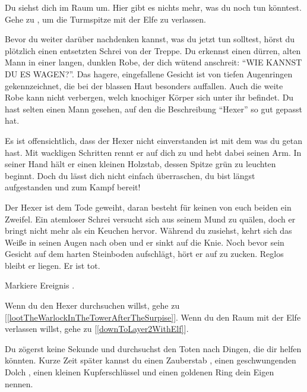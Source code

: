
Du siehst dich im Raum um. Hier gibt es nichts mehr, was du noch tun könntest.
Gehe zu , um die Turmspitze mit der Elfe zu verlassen.


Bevor du weiter darüber nachdenken kannst, was du jetzt tun solltest, hörst du plötzlich einen entsetzten Schrei von der Treppe. Du erkennst einen dürren, alten Mann in einer langen, dunklen Robe, der dich wütend anschreit: ``WIE KANNST DU ES WAGEN?''. Das hagere, eingefallene Gesicht ist von tiefen Augenringen gekennzeichnet, die bei der blassen Haut besonders auffallen. Auch die weite Robe kann nicht verbergen, welch knochiger Körper sich unter ihr befindet. Du hast selten einen Mann gesehen, auf den die Beschreibung ``Hexer'' so gut gepasst hat.

Es ist offensichtlich, dass der Hexer nicht einverstanden ist mit dem was du getan hast. Mit wackligen Schritten rennt er auf dich zu und hebt dabei seinen Arm. In seiner Hand hält er einen kleinen Holzstab, dessen Spitze grün zu leuchten beginnt. Doch du lässt dich nicht einfach überraschen, du bist längst aufgestanden und zum Kampf bereit!



Der Hexer ist dem Tode geweiht, daran besteht für keinen von euch beiden ein Zweifel. Ein atemloser Schrei versucht sich aus seinem Mund zu quälen, doch er bringt nicht mehr als ein Keuchen hervor. Während du zusiehst, kehrt sich das Weiße in seinen Augen nach oben und er sinkt auf die Knie. Noch bevor sein Gesicht auf dem harten Steinboden aufschlägt, hört er auf zu zucken. Reglos bleibt er liegen. Er ist tot.

Markiere Ereignis .

Wenn du den Hexer durchsuchen willst, gehe zu [\ref{lootTheWarlockInTheTowerAfterTheSurpise}].
Wenn du den Raum mit der Elfe verlassen willst, gehe zu [\ref{downToLayer2WithElf}].


Du zögerst keine Sekunde und durchsuchst den Toten nach Dingen, die dir helfen könnten.
Kurze Zeit später kannst du einen Zauberstab , einen geschwungenden Dolch , einen kleinen Kupferschlüssel  und einen goldenen Ring  dein Eigen nennen.

